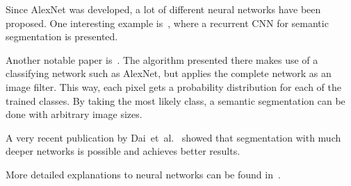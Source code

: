 Since AlexNet was developed, a lot of different neural networks have been
proposed. One interesting example is~\cite{pinheiro2013recurrent}, where
a recurrent \gls{CNN} for semantic segmentation is presented.

Another notable paper is~\cite{long2014fully}. The algorithm presented there
makes use of a classifying network such as AlexNet, but applies the complete
network as an image filter. This way, each pixel gets a probability
distribution for each of the trained classes. By taking the most likely class,
a semantic segmentation can be done with arbitrary image sizes.

A very recent publication by Dai~et~al.~\cite{dai2015instance} showed that
segmentation with much deeper networks is possible and achieves better results.

More detailed explanations to neural networks can be found
in~\cite{Teichmann2016}.
